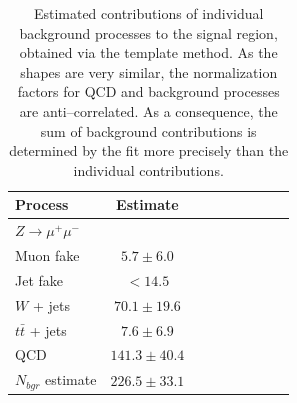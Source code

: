 \begin{table}[t]
\begin{center}
\tablesize
\begin{tabular}{|l|c|c|c|c|c|c|c|c|}
\hline
Process & Estimate \\
\hline
\hline
$Z \to \mu^{+} \mu^{-}$ & \\
\hspace{2mm} Muon fake &    $5.7 \pm  6.0$ \\
\hspace{2mm} Jet fake  & $< 14.5$ \\
$W$ + jets                 &   $70.1 \pm 19.6$ \\  
$t\bar{t}$ + jets          &    $7.6 \pm  6.9$ \\
QCD                        &  $141.3 \pm 40.4$ \\
\hline
$N_{bgr}$ estimate         &  $226.5 \pm 33.1$ \\
\hline
\end{tabular}
\caption{\captiontext Estimated contributions of individual background processes
to the signal region, obtained via the template method.  As the shapes are very
similar, the normalization factors for QCD and \WpJets background processes
are anti--correlated.  As a consequence, the sum of background contributions is
determined by the fit more precisely than the individual contributions.}
\label{tab:BgEstTemplateMethod}
\end{center}
\end{table}



\ifx\master\undefined\fi
